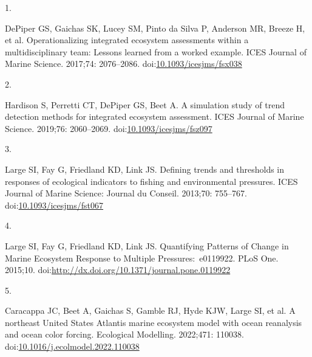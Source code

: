 \documentclass[
  10pt,
]{article}
\newlength{\cslhangindent}
\newlength{\csllabelwidth}
\newlength{\cslentryspacingunit} %
\newenvironment{CSLReferences}[2] %
 {%
  \setlength{\parindent}{0pt}
  \ifodd #1
  \let\oldpar\par
  \def\par{\hangindent=\cslhangindent\oldpar}
  \fi
  \setlength{\parskip}{#2\cslentryspacingunit}
 }%
 {}
\newcommand{\CSLLeftMargin}[1]{\parbox[t]{\csllabelwidth}{#1}}
\newcommand{\CSLRightInline}[1]{\parbox[t]{\linewidth - \csllabelwidth}{#1}\break}
\begin{document}
\hypertarget{refs}{}
\begin{CSLReferences}{0}{0}
\leavevmode{}%
\CSLLeftMargin{1. }%
\CSLRightInline{DePiper GS, Gaichas SK, Lucey SM, Pinto da Silva P,
Anderson MR, Breeze H, et al. Operationalizing integrated ecosystem
assessments within a multidisciplinary team: Lessons learned from a
worked example. ICES Journal of Marine Science. 2017;74: 2076--2086.
doi:\href{https://doi.org/10.1093/icesjms/fsx038}{10.1093/icesjms/fsx038}}

\leavevmode{}%
\CSLLeftMargin{2. }%
\CSLRightInline{Hardison S, Perretti CT, DePiper GS, Beet A. A
simulation study of trend detection methods for integrated ecosystem
assessment. ICES Journal of Marine Science. 2019;76: 2060--2069.
doi:\href{https://doi.org/10.1093/icesjms/fsz097}{10.1093/icesjms/fsz097}}

\leavevmode{}%
\CSLLeftMargin{3. }%
\CSLRightInline{Large SI, Fay G, Friedland KD, Link JS. Defining trends
and thresholds in responses of ecological indicators to fishing and
environmental pressures. ICES Journal of Marine Science: Journal du
Conseil. 2013;70: 755--767.
doi:\href{https://doi.org/10.1093/icesjms/fst067}{10.1093/icesjms/fst067}}

\leavevmode{}%
\CSLLeftMargin{4. }%
\CSLRightInline{Large SI, Fay G, Friedland KD, Link JS. Quantifying
{Patterns} of {Change} in {Marine} {Ecosystem} {Response} to {Multiple}
{Pressures}:~e0119922. PLoS One. 2015;10.
doi:\url{http://dx.doi.org/10.1371/journal.pone.0119922}}

\leavevmode{}%
\CSLLeftMargin{5. }%
\CSLRightInline{Caracappa JC, Beet A, Gaichas S, Gamble RJ, Hyde KJW,
Large SI, et al. A northeast {United} {States} {Atlantis} marine
ecosystem model with ocean reanalysis and ocean color forcing.
Ecological Modelling. 2022;471: 110038.
doi:\href{https://doi.org/10.1016/j.ecolmodel.2022.110038}{10.1016/j.ecolmodel.2022.110038}}

\end{CSLReferences}
\end{document}
